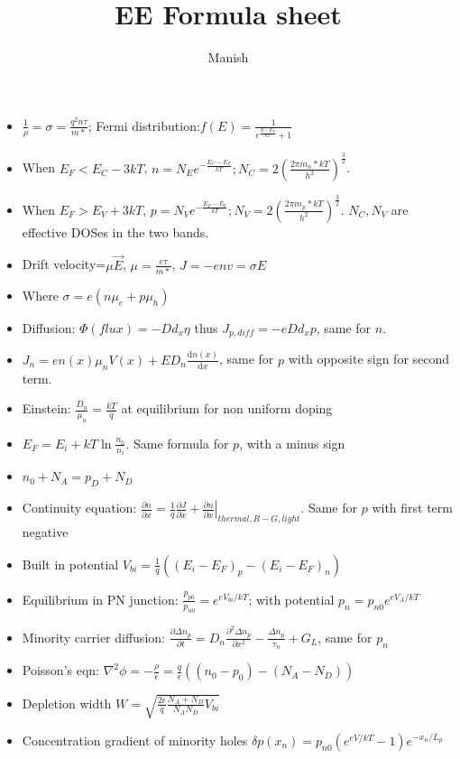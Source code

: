\documentclass[10pt]{article}
\title{EE Formula sheet}
\author{Manish}
\begin{document}
\maketitle
\begin{itemize}
\item $\frac1\rho=\sigma=\frac{q^2n\tau}{m*}$; Fermi distribution:$f(E)=\frac{1}{e^\frac{E-E_F}{kT} +1}$
\item When $E_F < E_C- 3kT$, $n=N_Ee^{-\frac{E_C-E_F}{kT}}; N_C=2\left(\frac{2\pi m_n*kT}{h^2}\right)^\frac32$.
\item When $ E_F > E_V + 3kT$, $p=N_Ve^{-\frac{E_F-E_V}{kT}}; N_V=2\left(\frac{2\pi m_p*kT}{h^2}\right)^\frac32$. $N_C,N_V$ are effective DOSes in the two bands.
\item Drift velocity=$\mu\vec E$, $\mu=\frac{e\tau}{m*}$, $J=-env=\sigma E$\\
\item Where $\sigma=e(n\mu_e+p\mu_h)$
\item Diffusion: $\Phi (flux) =-Dd_x\eta$ thus $J_{p,diff}=-eDd_xp$, same for $n$.
\item $J_n=en(x)\mu_nV(x) +ED_n\frac{\mathrm dn(x)}{\mathrm dx}$, same for $p$ with opposite sign for second term.
\item Einstein: $\frac{D_n}{\mu_n}=\frac{kT}{q}$ at equilibrium for non uniform doping
\item $E_F=E_i+kT\ln \frac{n_0}{n_i}$. Same formula for $p$, with a minus sign
\item $n_0+N_A=p_D+N_D$
\item Continuity equation: $\frac{\partial n}{\partial x}=\frac1{q}\frac{\partial J}{\partial x}+\left.\frac{\partial n}{\partial x}\right|_{thermal, R-G, light}$. Same for $p$ with first term negative
\item Built in potential $V_{bi}=\frac1{q}((E_i-E_F)_p -(E_i-E_F)_n)$
\item Equilibrium in PN junction: $\frac{p_{p0}}{p_{n0}}=e^{eV_{bi}/kT}$; with potential $p_n=p_{n0}e^{eV_A/kT}$ 
\item Minority carrier diffusion: $\frac{\partial \Delta n_p}{\partial t}=D_n\frac{\partial^2 \Delta n_p}{\partial x^2}-\frac{\Delta n_p}{\tau_n}+G_L$, same for $p_n$
\item Poisson's eqn: $\nabla^2\phi=-\frac\rho\epsilon=\frac{q}\epsilon((n_0-p_0)-(N_A-N_D))$
\item Depletion width $W=\sqrt{\frac{2\epsilon}{q}\frac{N_A+N_D}{N_AN_D}V_{bi}}$
\item Concentration gradient of minority holes $\delta p(x_n)=p_{n0}(e^{eV/kT}-1)e^{-x_n/L_p}$

\end{itemize}
\end{document}
